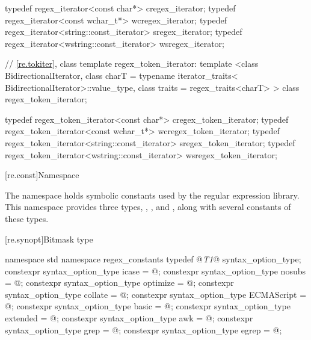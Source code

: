 \begin{codeblock}
{  typedef regex_iterator<const char*>             cregex_iterator;
  typedef regex_iterator<const wchar_t*>          wcregex_iterator;
  typedef regex_iterator<string::const_iterator>  sregex_iterator;
  typedef regex_iterator<wstring::const_iterator> wsregex_iterator;

  // \ref{re.tokiter}, class template regex_token_iterator:
  template <class BidirectionalIterator, 
            class charT = typename iterator_traits<
              BidirectionalIterator>::value_type,
            class traits = regex_traits<charT> >
    class regex_token_iterator;

  typedef regex_token_iterator<const char*>             cregex_token_iterator;
  typedef regex_token_iterator<const wchar_t*>          wcregex_token_iterator;
  typedef regex_token_iterator<string::const_iterator>  sregex_token_iterator;
  typedef regex_token_iterator<wstring::const_iterator> wsregex_token_iterator;
}
\end{codeblock}

[re.const]{Namespace }

\pnum
{}%
The namespace  holds
symbolic constants used by the regular expression library.  This
namespace provides three types, , 
, and , along with several
constants of these types.

[re.synopt]{Bitmask type }
%
%
\begin{codeblock}
namespace std {
  namespace regex_constants {
    typedef @\textit{T1}@ syntax_option_type;
    constexpr syntax_option_type icase = @\unspec@;
    constexpr syntax_option_type nosubs = @\unspec@;
    constexpr syntax_option_type optimize = @\unspec@;
    constexpr syntax_option_type collate = @\unspec@;
    constexpr syntax_option_type ECMAScript = @\unspec@;
    constexpr syntax_option_type basic = @\unspec@;
    constexpr syntax_option_type extended = @\unspec@;
    constexpr syntax_option_type awk = @\unspec@;
    constexpr syntax_option_type grep = @\unspec@;
    constexpr syntax_option_type egrep = @\unspec@;
  }
}
\end{codeblock}

